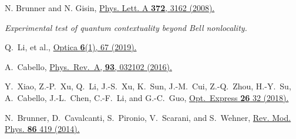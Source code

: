 \documentclass[pra,aps,notitlepage,superscriptaddress,showpacs,showkeys]{revtex4-1}
\theoremstyle{definition}
\theoremstyle{remark}
\begin{document}
\begin{thebibliography}{99}

 N. Brunner and N. Gisin,
 \href{http://dx.doi.org/10.1016/j.physleta.2008.01.052}{Phys. Lett. A \textbf{372}, 3162 (2008).}
 
  \textit{Experimental test of quantum contextuality beyond Bell nonlocality.}
 
 Q.~Li, et al.,
 \href{https://doi.org/10.1364/OPTICA.6.000067}{Optica \textbf{6}(1), 67 (2019).}

 A.~Cabello,
 \href{https://doi.org/10.1103/PhysRevA.93.032102}{Phys.~Rev.~A, \textbf{93}, 032102 (2016).}

 Y.~Xiao, Z.-P.~Xu, Q.~Li, J.-S.~Xu, K.~Sun, J.-M.~Cui, Z.-Q.~Zhou, H.-Y.~Su, A.~Cabello, J.-L.~Chen, C.-F.~Li, and G.-C.~Guo,
 \href{https://doi.org/10.1364/OE.26.000032}{Opt.~Express \textbf{26} 32 (2018).}

 N.~Brunner, D.~Cavalcanti, S.~Pironio, V.~Scarani, and S.~Wehner,
 \href{https://doi.org/10.1103/RevModPhys.86.419}{Rev. Mod. Phys. \textbf{86} 419 (2014).}
 
\end{thebibliography}
\end{document}
